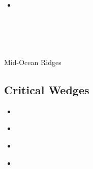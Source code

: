 \begin{scriptsize}
\begin{itemize}
\textcite{nebg21} \\
\textcite{qill21} \\
\textcite{luhu21} \\
\textcite{gona21} \\
\textcite{manp21} \\
\textcite{jokd21} \\
\textcite{grrm21} \\
\textcite{deol21} \\
\item[\twothousandtwentytwo] 
\textcite{thhu22} \\
\textcite{olgr22} \\
\textcite{ludn22} \\
\textcite{rutb22} \\
\textcite{thhl22} \\
\end{itemize}
\end{scriptsize}


Mid-Ocean Ridges

\textcite{pukm22} 






\subsection{Critical Wedges}

\begin{scriptsize}
\begin{itemize}
\item[\nineteenninetyfour] 
\textcite{koon94}\\
\item[\twothousandsix] 
\textcite{rosw06}\\
\item[\twothousandeight] 
\textcite{rowf08}\\
\item[\twothousandthirteen] 
\textcite{cass13}\\
\end{itemize}
\end{scriptsize}

